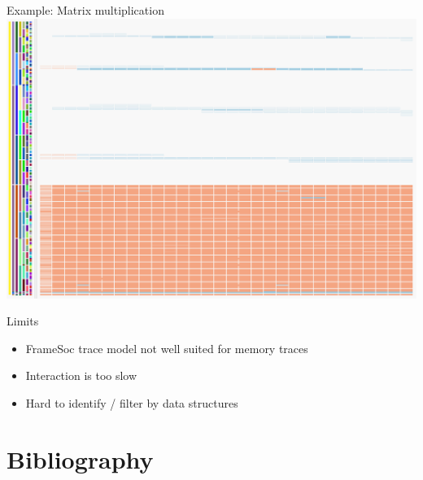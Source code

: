 \documentclass[xcolor={usenames,dvipsnames},hyperref={pdfusetitle}]{beamer}
\begin{document}
\begin{frame}{Example: Matrix multiplication}
{{{{                }{
                    \includegraphics[width=\textwidth]{ocelotl/Sharing-zoom.png}
                }
            }
        }
    }
    \pause
    \pause
    \pause
    \pause
\end{frame}%

\begin{frame}{Limits}
    \begin{itemize}
        \item FrameSoc trace model not well suited for memory traces
        \item Interaction is too slow
        \item Hard to identify / filter by data structures
    \end{itemize}
\end{frame}



\section*{Bibliography}
%


\end{document}
